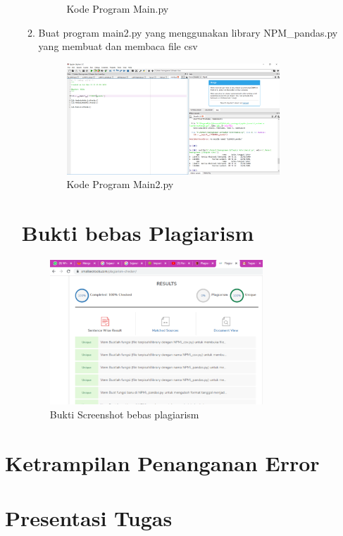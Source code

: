 \documentclass[a4paper, 12pt]{article}
\begin{document}
\begin{enumerate}
\begin{enumerate}
\begin{figure}[H]
			\centering
			\caption{Kode Program Main.py}
	\end{figure}
\item Buat program main2.py yang menggunakan library NPM\_pandas.py yang membuat dan membaca file csv

\begin{figure}[H]
			\includegraphics[width=8cm]{figures/kp2.png}
			\centering
			\caption{Kode Program Main2.py}
	\end{figure}
\end{enumerate}
\section{Bukti bebas Plagiarism}
\begin{figure}[H]
			\includegraphics[width=8cm]{figures/ss2.png}
			\centering
			\caption{Bukti Screenshot bebas plagiarism}
	\end{figure}
\end{enumerate}
\section{Ketrampilan Penanganan Error}

\section{Presentasi Tugas}
\end{document}
